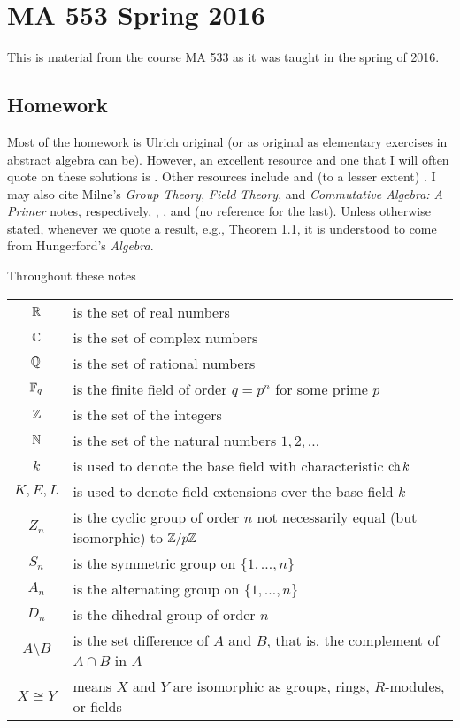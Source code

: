 \section{MA 553 Spring 2016}
This is material from the course MA 533 as it was taught in the spring of
2016.%
\bigskip
\subsection{Homework}
Most of the homework is Ulrich original (or as original as elementary
exercises in abstract algebra can be). However, an excellent resource and
one that I will often quote on these solutions is \cite{hungerford}. Other
resources include \cite{dummit-foote} and (to a lesser extent)
\cite{herstein}. I may also cite Milne's \emph{Group Theory}, \emph{Field
  Theory}, and \emph{Commutative Algebra: A Primer} notes, respectively,
\cite{milneGT}, \cite{milneFT}, and (no reference for the last). Unless
otherwise stated, whenever we quote a result, e.g., Theorem 1.1, it is
understood to come from Hungerford's \emph{Algebra}.

Throughout these notes

\begin{tabular}{cl}
  \(\mathbb{R}\)   & is the set of real numbers\\
  \(\mathbb{C}\)   & is the set of complex numbers\\
  \(\mathbb{Q}\)   & is the set of rational numbers\\
  \(\mathbb{F}_q\) & is the finite field of order \(q=p^n\) for some prime \(p\)\\
  \(\mathbb{Z}\)   & is the set of the integers\\
  \(\mathbb{N}\)   & is the set of the natural numbers \(1,2,\dotsc\)\\
  \(k\)   & is used to denote the base field with
            characteristic \(\operatorname{ch} k\)\\
  \(K,E,L\)& is used to denote field extensions over the base field
             \(k\)\\
  \(Z_n\)    & is the cyclic group of order \(n\) not necessarily equal
               (but isomorphic) to \(\mathbb{Z}/p\mathbb{Z}\)\\
  \(S_n\)    & is the symmetric group on \(\{1,\dotsc,n\}\)\\
  \(A_n\)    & is the alternating group on \(\{1,\dotsc,n\}\)\\
  \(D_n\)    & is the dihedral group of order \(n\)\\
  \(A\setminus B\) & is the set difference of \(A\) and \(B\), that is, the
                     complement of \(A\cap B\) in \(A\)\\
  \(X\cong Y\) & means \(X\) and \(Y\) are isomorphic as groups, rings,
                 \(R\)-modules, or fields
\end{tabular}

